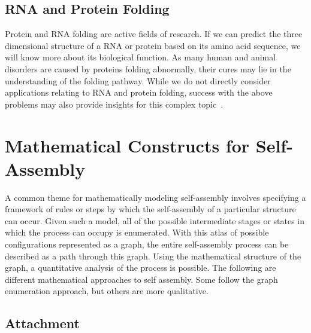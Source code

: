 \subsection{RNA and Protein Folding}

Protein and RNA folding are active fields of research. If we can predict the three dimensional structure of a RNA or protein based on its amino acid sequence, we will know more about its biological function. As many human and animal disorders are caused by proteins folding abnormally, their cures may lie in the understanding of the folding pathway. While we do not directly consider applications relating to RNA and protein folding, success with the above problems may also provide insights for this complex topic~\cite{Lindorff-Larsen2011}.


\section{Mathematical Constructs for Self-Assembly}

A common theme for mathematically modeling self-assembly involves specifying a framework of rules or steps by which the self-assembly of a particular structure can occur. Given such a model, all of the possible intermediate stages or states in which the process can occupy is enumerated. With this atlas of possible configurations represented as a graph, the entire self-assembly process can be described as a path through this graph. Using the mathematical structure of the graph, a quantitative analysis of the process is possible. The following are different mathematical approaches to self assembly. Some follow the graph enumeration approach, but others are more qualitative. 


\subsection{Attachment}

